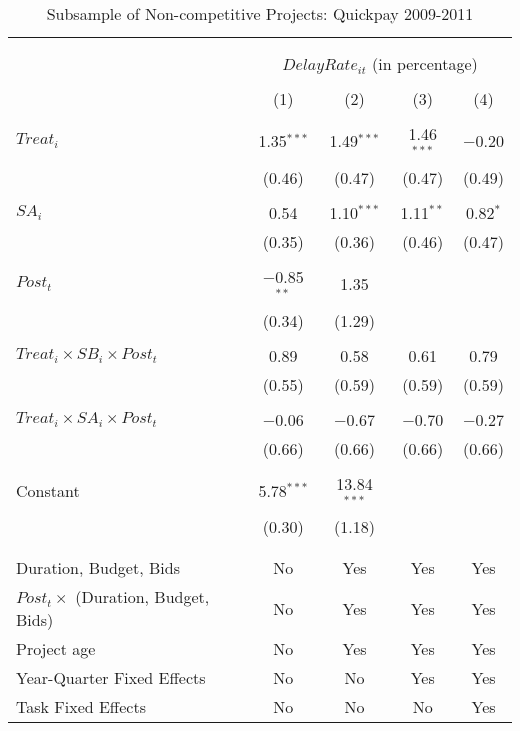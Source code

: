 \documentclass[
]{article}
\begin{document}
\begin{table}[H] \centering 
  \caption{Subsample of Non-competitive Projects: Quickpay 2009-2011} 
  \label{} 
\small 
\begin{tabular}{@{\extracolsep{-2pt}}lcccc} 
\\[-1.8ex]\hline 
\hline \\[-1.8ex] 
\\[-1.8ex] & \multicolumn{4}{c}{$DelayRate_{it}$ (in percentage)} \\ 
\\[-1.8ex] & (1) & (2) & (3) & (4)\\ 
\hline \\[-1.8ex] 
 $Treat_i$ & 1.35$^{***}$ & 1.49$^{***}$ & 1.46$^{***}$ & $-$0.20 \\ 
  & (0.46) & (0.47) & (0.47) & (0.49) \\ 
  & & & & \\ 
 $SA_i$ & 0.54 & 1.10$^{***}$ & 1.11$^{**}$ & 0.82$^{*}$ \\ 
  & (0.35) & (0.36) & (0.46) & (0.47) \\ 
  & & & & \\ 
 $Post_t$ & $-$0.85$^{**}$ & 1.35 &  &  \\ 
  & (0.34) & (1.29) &  &  \\ 
  & & & & \\ 
 $Treat_i \times SB_i \times Post_t$ & 0.89 & 0.58 & 0.61 & 0.79 \\ 
  & (0.55) & (0.59) & (0.59) & (0.59) \\ 
  & & & & \\ 
 $Treat_i \times SA_i \times Post_t$ & $-$0.06 & $-$0.67 & $-$0.70 & $-$0.27 \\ 
  & (0.66) & (0.66) & (0.66) & (0.66) \\ 
  & & & & \\ 
 Constant & 5.78$^{***}$ & 13.84$^{***}$ &  &  \\ 
  & (0.30) & (1.18) &  &  \\ 
  & & & & \\ 
\hline \\[-1.8ex] 
Duration, Budget, Bids & No & Yes & Yes & Yes \\ 
$Post_t \times $  (Duration, Budget, Bids) & No & Yes & Yes & Yes \\ 
Project age & No & Yes & Yes & Yes \\ 
Year-Quarter Fixed Effects & No & No & Yes & Yes \\ 
Task Fixed Effects & No & No & No & Yes \\ 

\end{tabular}
\end{table}
\end{document}
